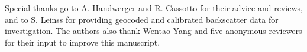 \documentclass[nhess, manuscript]{copernicus}
\begin{document}

\begin{acknowledgements}
Special thanks go to A. Handwerger and R. Cassotto for their advice and reviews, and to S. Leinss for providing geocoded and calibrated backscatter data for investigation. The authors also thank Wentao Yang and five anonymous reviewers for their input to improve this manuscript. 
\end{acknowledgements}





















\end{document}
